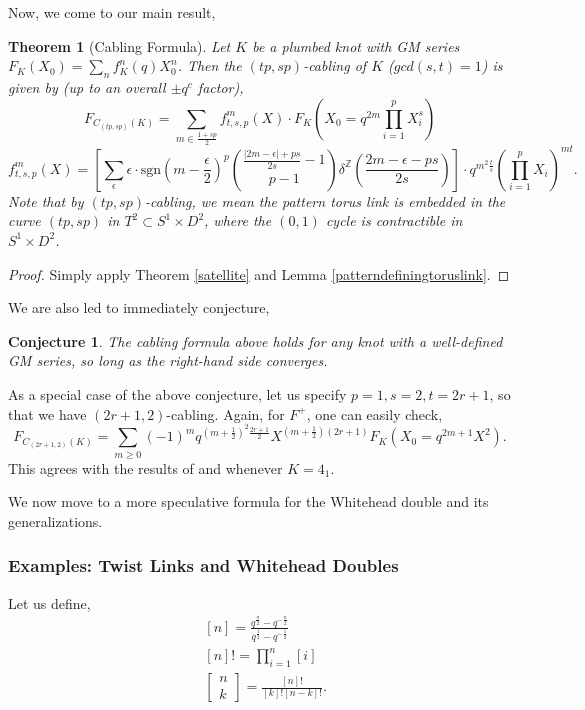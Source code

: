 \documentclass{article}
\newtheorem{theorem}{Theorem}
\newtheorem{conjecture}{Conjecture}
\numberwithin{corollary}{theorem}
\numberwithin{corollary}{proposition}
\begin{document}
Now, we come to our main result,
\begin{theorem}[Cabling Formula]
    Let $K$ be a plumbed knot with GM series $F_K (X_0) = \sum_n f^n_K(q)X^n_0$. Then the $(tp,sp)$-cabling of $K$ ($gcd(s,t)=1$) is given by (up to an overall $\pm q^c$ factor),
    $$F_{C_{(tp,sp)}(K)} = \sum_{m\in \frac{1+sp}{2}} f^m_{t,s,p}(X) \cdot F_K(X_0 = q^{2m} \prod^p_{i=1}X^s_i) $$
    $$f^m_{t,s,p}(X) = \left[ \sum_\epsilon \epsilon \cdot \mathrm{sgn}(m-\frac{\epsilon}{2} )^p \binom{\frac{|2m -\epsilon|+ps}{2s}-1}{p-1} \delta^\mathbb{Z}\left( \frac{2m-\epsilon-ps}{2s}\right)\right] \cdot q^{m^2 \frac{t}{s} }(\prod^p_{i=1}X_i)^{mt}.$$
    Note that by $(tp,sp)$-cabling, we mean the pattern torus link is embedded in the curve $(tp,sp)$ in $T^2 \subset S^1 \times D^2$, where the $(0,1)$ cycle is contractible in $S^1 \times D^2$. 
\end{theorem}
\begin{proof}
    Simply apply Theorem \ref{satellite} and Lemma \ref{patterndefiningtoruslink}.
\end{proof}

We are also led to immediately conjecture, 
\begin{conjecture}
    The cabling formula above holds for any knot with a well-defined GM series, so long as the right-hand side converges.
\end{conjecture}

As a special case of the above conjecture, let us specify $p=1,s=2,t=2r+1$, so that we have $(2r+1,2)$-cabling. Again, for $F^+$, one can easily check,
$$F_{C_{(2r+1,2)}(K)} = \sum_{m\geq0}(-1)^m q^{(m+\frac{1}{2})^2 \frac{2r+1}{2}}X^{(m+\frac{1}{2})(2r+1)} F_K(X_0 = q^{2m+1}X^2).$$
This agrees with the results of \cite{John} and \cite{John2} whenever $K = 4_1$. 

We now move to a more speculative formula for the Whitehead double and its generalizations. 

\subsubsection{Examples: Twist Links and Whitehead Doubles}
Let us define,
\begin{align*}
&[n]= \frac{q^{\frac{n}{2}}-q^{-\frac{n}{2}}}{q^{\frac{1}{2}}-q^{-\frac{1}{2}}}\\
&[n]! = \prod^n_{i=1}[i]\\
& \begin{bmatrix}
    n\\k
\end{bmatrix} = \frac{[n]!}{[k]![n-k]!}.
\end{align*}
\end{document}

